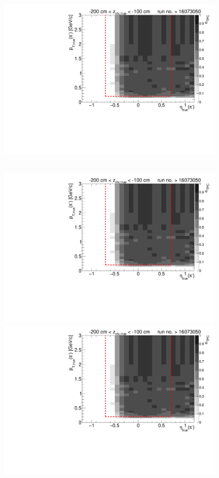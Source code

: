 \begin{figure}[hb]
{		\includegraphics[width=\linewidth,page=17]{graphics/eff/Eff2D_TPC_pion_Minus_RunRange2.pdf}
	}~
	\parbox{0.495\textwidth}{
		\centering
		\includegraphics[width=\linewidth,page=12]{graphics/eff/Eff2D_TPC_pion_Minus_RunRange2.pdf}\\
		\includegraphics[width=\linewidth,page=14]{graphics/eff/Eff2D_TPC_pion_Minus_RunRange2.pdf}\\
}
\end{figure}
